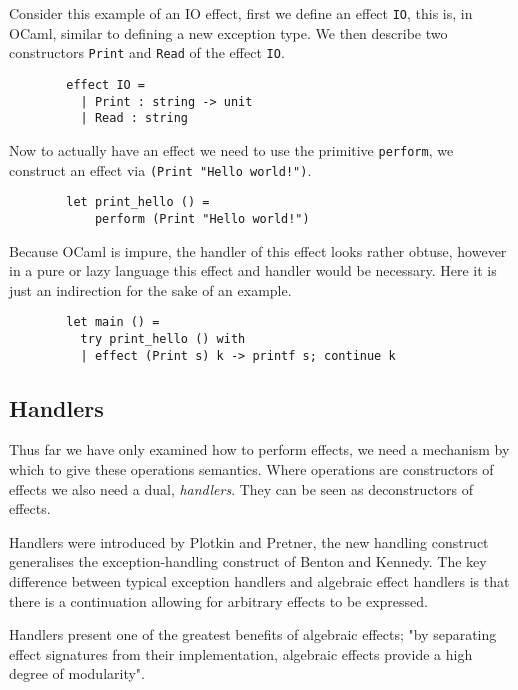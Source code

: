 \begin{example}
    Consider this example of an IO effect,
    first we define an effect \texttt{IO},
    this is, in OCaml, similar to defining
    a new exception type.
    We then describe two constructors
    \texttt{Print} and \texttt{Read}
    of the effect \texttt{IO}.
    \begin{verbatim}
        effect IO =
          | Print : string -> unit
          | Read : string\end{verbatim}
    Now to actually have an effect we need to use the primitive \texttt{perform},
    we construct an effect via \texttt{(Print "Hello world!")}.
    \begin{verbatim}
        let print_hello () =
            perform (Print "Hello world!")\end{verbatim}
    Because OCaml is impure, the handler of this effect looks rather obtuse,
    however in a pure or lazy language this effect and handler would be necessary.
    Here it is just an indirection for the sake of an example.
    \begin{verbatim}
        let main () =
          try print_hello () with
          | effect (Print s) k -> printf s; continue k\end{verbatim}
\end{example}

\subsection{Handlers}
Thus far we have only examined how to perform effects,
we need a mechanism by which to give these operations semantics.
Where operations are constructors of effects we also need a dual, \textit{handlers}.
They can be seen as deconstructors of effects\cite{Plotkin:2002dw}.

Handlers were introduced by Plotkin and Pretner\cite{Plotkin:2009dr},
the new handling construct generalises the exception-handling
construct of Benton and Kennedy\cite{benton2001exceptional}.
The key difference between typical exception handlers
and algebraic effect handlers is that
there is a continuation allowing for arbitrary effects to be expressed.

Handlers present one of the greatest benefits of algebraic effects;
"by separating effect signatures from their implementation,
algebraic effects provide a high degree of modularity"\cite{kammar2013handlers}.


